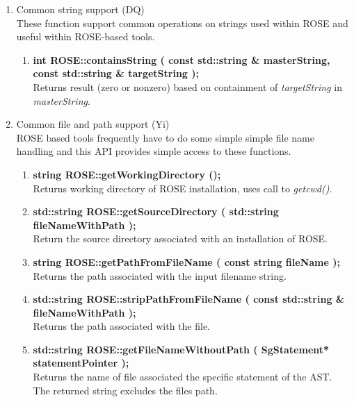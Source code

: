 \begin{enumerate}
   \item Common string support (DQ) \\
         These function support common operations on strings used within ROSE and 
         useful within ROSE-based tools.
   \begin{enumerate}
      \item {\bf int ROSE::containsString ( const std::string \& masterString, const std::string \& targetString );} \\
      Returns result (zero or nonzero) based on containment of {\em targetString} in {\em masterString}.
   \end{enumerate}

   \item Common file and path support (Yi) \\
   ROSE based tools frequently have to do some simple simple file name handling
   and this API provides simple access to these functions.
   \begin{enumerate}
      \item {\bf string ROSE::getWorkingDirectory ();} \\
      Returns working directory of ROSE installation, uses call to {\em getcwd()}.

      \item {\bf std::string ROSE::getSourceDirectory ( std::string fileNameWithPath );} \\
      Return the source directory associated with an installation of ROSE.

      \item {\bf string ROSE::getPathFromFileName ( const string fileName );} \\
      Returns the path associated with the input filename string.

      \item {\bf std::string ROSE::stripPathFromFileName ( const std::string \& fileNameWithPath );} \\
      Returns the path associated with the file.

      \item {\bf std::string ROSE::getFileNameWithoutPath ( SgStatement* statementPointer );} \\
      Returns the name of file associated the specific statement of the AST. The returned
      string excludes the files path.


\end{enumerate}
\end{enumerate}
